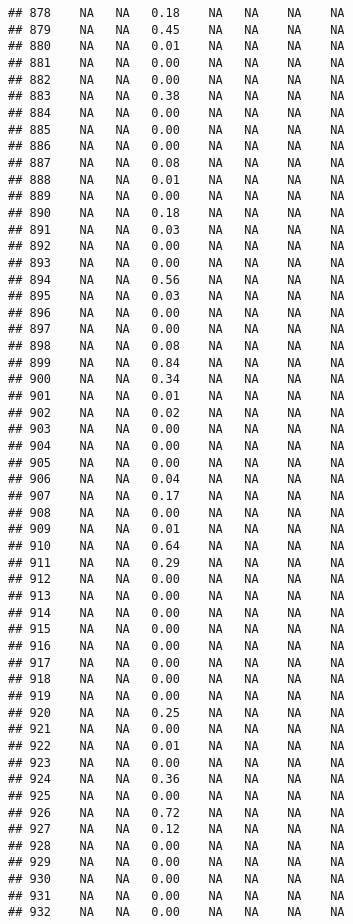 \documentclass{article}\usepackage{graphicx, color}
\makeatletter
\newenvironment{kframe}{%
 \def\at@end@of@kframe{}%
 \ifinner\ifhmode%
  \def\at@end@of@kframe{\end{minipage}}%
  \begin{minipage}{\columnwidth}%
 \fi\fi%
 \def\FrameCommand##1{\hskip\@totalleftmargin \hskip-\fboxsep
 \colorbox{shadecolor}{##1}\hskip-\fboxsep
     \hskip-\linewidth \hskip-\@totalleftmargin \hskip\columnwidth}%
 \MakeFramed {\advance\hsize-\width
   \@totalleftmargin\z@ \linewidth\hsize
   \@setminipage}}%
 {\par\unskip\endMakeFramed%
 \at@end@of@kframe}
\newenvironment{knitrout}{}{} %
\makeatother
\begin{document}
\begin{knitrout}
\begin{kframe}
\begin{verbatim}
## 878    NA   NA   0.18    NA   NA    NA    NA
## 879    NA   NA   0.45    NA   NA    NA    NA
## 880    NA   NA   0.01    NA   NA    NA    NA
## 881    NA   NA   0.00    NA   NA    NA    NA
## 882    NA   NA   0.00    NA   NA    NA    NA
## 883    NA   NA   0.38    NA   NA    NA    NA
## 884    NA   NA   0.00    NA   NA    NA    NA
## 885    NA   NA   0.00    NA   NA    NA    NA
## 886    NA   NA   0.00    NA   NA    NA    NA
## 887    NA   NA   0.08    NA   NA    NA    NA
## 888    NA   NA   0.01    NA   NA    NA    NA
## 889    NA   NA   0.00    NA   NA    NA    NA
## 890    NA   NA   0.18    NA   NA    NA    NA
## 891    NA   NA   0.03    NA   NA    NA    NA
## 892    NA   NA   0.00    NA   NA    NA    NA
## 893    NA   NA   0.00    NA   NA    NA    NA
## 894    NA   NA   0.56    NA   NA    NA    NA
## 895    NA   NA   0.03    NA   NA    NA    NA
## 896    NA   NA   0.00    NA   NA    NA    NA
## 897    NA   NA   0.00    NA   NA    NA    NA
## 898    NA   NA   0.08    NA   NA    NA    NA
## 899    NA   NA   0.84    NA   NA    NA    NA
## 900    NA   NA   0.34    NA   NA    NA    NA
## 901    NA   NA   0.01    NA   NA    NA    NA
## 902    NA   NA   0.02    NA   NA    NA    NA
## 903    NA   NA   0.00    NA   NA    NA    NA
## 904    NA   NA   0.00    NA   NA    NA    NA
## 905    NA   NA   0.00    NA   NA    NA    NA
## 906    NA   NA   0.04    NA   NA    NA    NA
## 907    NA   NA   0.17    NA   NA    NA    NA
## 908    NA   NA   0.00    NA   NA    NA    NA
## 909    NA   NA   0.01    NA   NA    NA    NA
## 910    NA   NA   0.64    NA   NA    NA    NA
## 911    NA   NA   0.29    NA   NA    NA    NA
## 912    NA   NA   0.00    NA   NA    NA    NA
## 913    NA   NA   0.00    NA   NA    NA    NA
## 914    NA   NA   0.00    NA   NA    NA    NA
## 915    NA   NA   0.00    NA   NA    NA    NA
## 916    NA   NA   0.00    NA   NA    NA    NA
## 917    NA   NA   0.00    NA   NA    NA    NA
## 918    NA   NA   0.00    NA   NA    NA    NA
## 919    NA   NA   0.00    NA   NA    NA    NA
## 920    NA   NA   0.25    NA   NA    NA    NA
## 921    NA   NA   0.00    NA   NA    NA    NA
## 922    NA   NA   0.01    NA   NA    NA    NA
## 923    NA   NA   0.00    NA   NA    NA    NA
## 924    NA   NA   0.36    NA   NA    NA    NA
## 925    NA   NA   0.00    NA   NA    NA    NA
## 926    NA   NA   0.72    NA   NA    NA    NA
## 927    NA   NA   0.12    NA   NA    NA    NA
## 928    NA   NA   0.00    NA   NA    NA    NA
## 929    NA   NA   0.00    NA   NA    NA    NA
## 930    NA   NA   0.00    NA   NA    NA    NA
## 931    NA   NA   0.00    NA   NA    NA    NA
## 932    NA   NA   0.00    NA   NA    NA    NA

\end{verbatim}
\end{kframe}
\end{knitrout}
\end{document}
